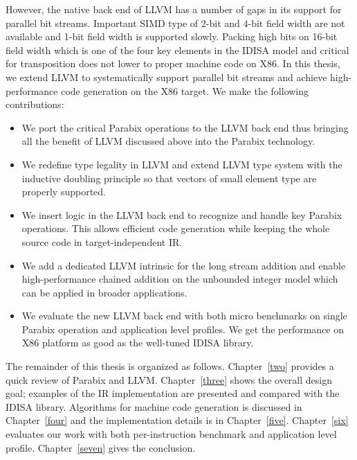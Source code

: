 However, the native back end of LLVM has a number of gaps in its support for parallel bit streams. Important SIMD type of 2-bit and 4-bit field width are not available and 1-bit field width is supported slowly. Packing high bits on 16-bit field width which is one of the four key elements in the IDISA model and critical for transposition does not lower to proper machine code on X86. In this thesis, we extend LLVM to systematically support parallel bit streams and achieve high-performance code generation on the X86 target. We make the following contributions:

\begin{itemize}
  \item We port the critical Parabix operations to the LLVM back end thus bringing all the benefit of LLVM discussed above into the Parabix technology.
  \item We redefine type legality in LLVM and extend LLVM type system with the inductive doubling principle so that vectors of small element type are properly supported.
  \item We insert logic in the LLVM back end to recognize and handle key Parabix operations. This allows efficient code generation while keeping the whole source code in target-independent IR\@.
  \item We add a dedicated LLVM intrinsic for the long stream addition and enable high-performance chained addition on the unbounded integer model which can be applied in broader applications.
  \item We evaluate the new LLVM back end with both micro benchmarks on single Parabix operation and application level profiles. We get the performance on X86 platform as good as the well-tuned IDISA library.
\end{itemize}

The remainder of this thesis is organized as follows. Chapter~\ref{two} provides a quick review of Parabix and LLVM\@. Chapter~\ref{three} shows the overall design goal; examples of the IR implementation are presented and compared with the IDISA library. Algorithms for machine code generation is discussed in Chapter~\ref{four} and the implementation details is in Chapter~\ref{five}. Chapter~\ref{six} evaluates our work with both per-instruction benchmark and application level profile. Chapter~\ref{seven} gives the conclusion.

